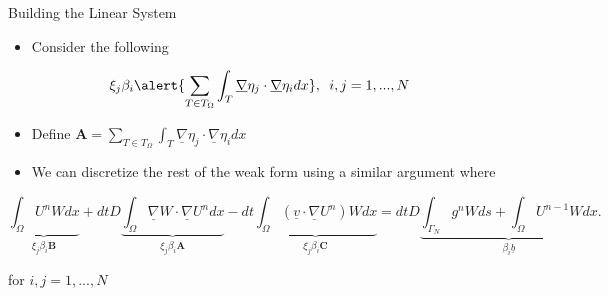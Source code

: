 \documentclass[10pt]{beamer}
\begin{document}
\begin{frame}{Building the Linear System}\label{BuildLinearSystem}
\begin{itemize}
\item Consider the following
\end{itemize}
\begin{equation}
\xi_{j}\beta_{i}\alert{\sum_{T \in T_{\Omega}}\int_{T} \underline{\nabla} \eta_{j} \cdot \underline{\nabla}\eta_{i} dx}, \texttt{ } i,j=1,...,N
\end{equation}

\begin{itemize}
\item Define $\mathbf{A} = \sum_{T \in T_{\Omega}}\int_{T} \underline{\nabla} \eta_{j} \cdot \underline{\nabla}\eta_{i} dx$
\end{itemize}

\begin{itemize}
\item We can discretize the rest of the weak form using a similar argument where
\end{itemize}

\footnotesize
\begin{equation}
\underbrace{\int_{\Omega}U^{n}W dx}_{ \xi_{j}\beta_{i}\mathbf{B}} +dtD\underbrace{\int_{\Omega}\underline{\nabla}W \cdot \underline{\nabla} U^{n} dx}_{ \xi_{j}\beta_{i}\mathbf{A}}-dt\underbrace{\int_{\Omega}\left(\underline{v}\cdot \underline{\nabla}U^{n}\right)W dx}_{ \xi_{j}\beta_{i}\mathbf{C}}=dtD\underbrace{\int_{\Gamma_{N}}g^{n}W ds+ \int_{\Omega} U^{n-1}W dx}_{ \beta_{i}\underline{b}}.
\end{equation}

\normalsize
for $i,j=1,...,N$
\hyperlink{Questions}{}
\end{frame}
\end{document}
